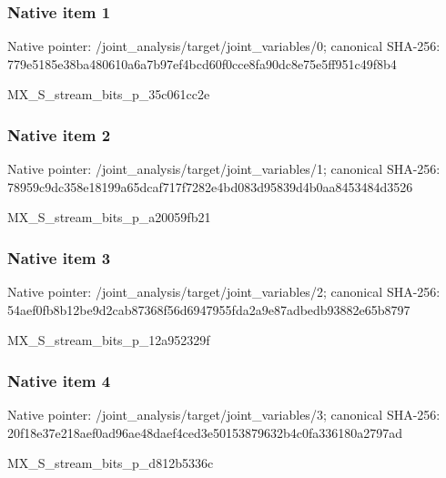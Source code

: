 \documentclass[10pt,a4paper]{article}
\begin{document}
\subsubsection{Native item 1}
Native pointer: /joint\_\allowbreak{}analysis/target/joint\_\allowbreak{}variables/0; canonical SHA-256: 779e5185e38ba480610a6a7b97ef4bcd60f0cce8fa90dc8e75e5ff951c49f8b4

\begingroup\raggedright\sloppy MX\_\allowbreak{}S\_\allowbreak{}stream\_\allowbreak{}bits\_\allowbreak{}p\_\allowbreak{}35c061cc2e\par\endgroup

\subsubsection{Native item 2}
Native pointer: /joint\_\allowbreak{}analysis/target/joint\_\allowbreak{}variables/1; canonical SHA-256: 78959c9dc358e18199a65dcaf717f7282e4bd083d95839d4b0aa8453484d3526

\begingroup\raggedright\sloppy MX\_\allowbreak{}S\_\allowbreak{}stream\_\allowbreak{}bits\_\allowbreak{}p\_\allowbreak{}a20059fb21\par\endgroup

\subsubsection{Native item 3}
Native pointer: /joint\_\allowbreak{}analysis/target/joint\_\allowbreak{}variables/2; canonical SHA-256: 54aef0fb8b12be9d2cab87368f56d6947955fda2a9e87adbedb93882e65b8797

\begingroup\raggedright\sloppy MX\_\allowbreak{}S\_\allowbreak{}stream\_\allowbreak{}bits\_\allowbreak{}p\_\allowbreak{}12a952329f\par\endgroup

\subsubsection{Native item 4}
Native pointer: /joint\_\allowbreak{}analysis/target/joint\_\allowbreak{}variables/3; canonical SHA-256: 20f18e37e218aef0ad96ae48daef4ced3e50153879632b4c0fa336180a2797ad

\begingroup\raggedright\sloppy MX\_\allowbreak{}S\_\allowbreak{}stream\_\allowbreak{}bits\_\allowbreak{}p\_\allowbreak{}d812b5336c\par\endgroup
\end{document}
